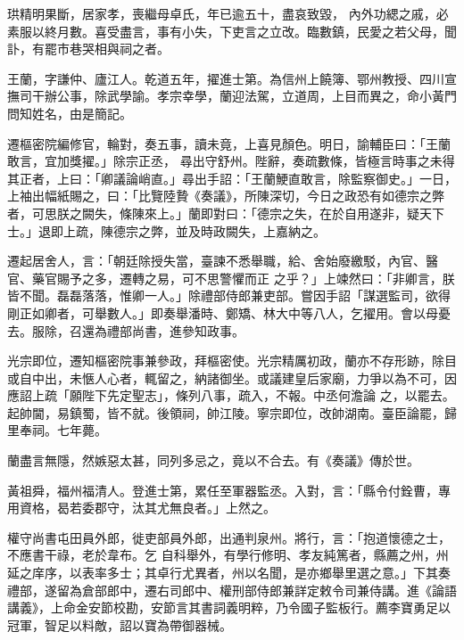 \begin{pinyinscope}
 珙精明果斷，居家孝，喪繼母卓氏，年已逾五十，盡哀致毀，
 內外功緦之戚，必素服以終月數。喜受盡言，事有小失，下吏言之立改。臨數鎮，民愛之若父母，聞訃，有罷市巷哭相與祠之者。



 王蘭，字謙仲、廬江人。乾道五年，擢進士第。為信州上饒簿、鄂州教授、四川宣撫司干辦公事，除武學諭。孝宗幸學，蘭迎法駕，立道周，上目而異之，命小黃門問知姓名，由是簡記。



 遷樞密院編修官，輪對，奏五事，讀未竟，上喜見顏色。明日，諭輔臣曰：「王蘭敢言，宜加獎擢。」除宗正丞，
 尋出守舒州。陛辭，奏疏數條，皆極言時事之未得其正者，上曰：「卿議論峭直。」尋出手詔：「王蘭鯁直敢言，除監察御史。」一日，上袖出幅紙賜之，曰：「比覽陸贄《奏議》，所陳深切，今日之政恐有如德宗之弊者，可思朕之闕失，條陳來上。」蘭即對曰：「德宗之失，在於自用遂非，疑天下士。」退即上疏，陳德宗之弊，並及時政闕失，上嘉納之。



 遷起居舍人，言：「朝廷除授失當，臺諫不悉舉職，給、舍始廢繳駁，內官、醫官、藥官賜予之多，遷轉之易，可不思警懼而正
 之乎？」上竦然曰：「非卿言，朕皆不聞。磊磊落落，惟卿一人。」除禮部侍郎兼吏部。嘗因手詔「謀選監司，欲得剛正如卿者，可舉數人。」即奏舉潘時、鄭矯、林大中等八人，乞擢用。會以母憂去。服除，召還為禮部尚書，進參知政事。



 光宗即位，遷知樞密院事兼參政，拜樞密使。光宗精厲初政，蘭亦不存形跡，除目或自中出，未愜人心者，輒留之，納諸御坐。或議建皇后家廟，力爭以為不可，因應詔上疏「願陛下先定聖志」，條列八事，疏入，不報。中丞何澹論
 之，以罷去。起帥閫，易鎮蜀，皆不就。後領祠，帥江陵。寧宗即位，改帥湖南。臺臣論罷，歸里奉祠。七年薨。



 蘭盡言無隱，然嫉惡太甚，同列多忌之，竟以不合去。有《奏議》傳於世。



 黃祖舜，福州福清人。登進士第，累任至軍器監丞。入對，言：「縣令付銓曹，專用資格，曷若委郡守，汰其尤無良者。」上然之。



 權守尚書屯田員外郎，徙吏部員外郎，出通判泉州。將行，言：「抱道懷德之士，不應書干祿，老於韋布。乞
 自科舉外，有學行修明、孝友純篤者，縣薦之州，州延之庠序，以表率多士；其卓行尤異者，州以名聞，是亦鄉舉里選之意。」下其奏禮部，遂留為倉部郎中，遷右司郎中、權刑部侍郎兼詳定敕令司兼侍講。進《論語講義》，上命金安節校勘，安節言其書詞義明粹，乃令國子監板行。薦李寶勇足以冠軍，智足以料敵，詔以寶為帶御器械。




\end{pinyinscope}

